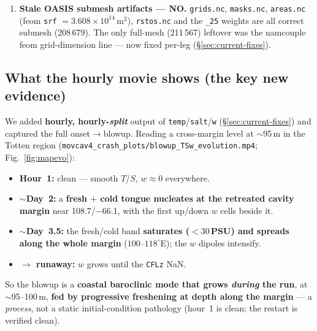 \documentclass[11pt,a4paper]{article}
\newcommand{\code}[1]{\texttt{\small #1}}
\newcommand{\file}[1]{\texttt{\footnotesize #1}}
\begin{document}
\begin{enumerate}[leftmargin=1.6em,itemsep=3pt]
        \textbf{legitimate under-ice cavity masking} (level-index~0 at cavity nodes with
        \code{ulevels}~$2$--$27$), \emph{not} a fresh cap; at each node's \emph{first wet
        level} $S$ is normal and matches the source, and \emph{none} of those nodes retreated.
        The $\sim$12\,PSU seen in the blowup-file profile is the \emph{evolved} state (the
        symptom), not the initial condition. \textbf{Do not re-chase this.}
  \item \textbf{Stale OASIS submesh artifacts --- NO.} \file{grids.nc}, \file{masks.nc},
        \file{areas.nc} (feom \code{srf} $=3.608\times10^{14}$\,m$^2$), \file{rstos.nc} and
        the \code{\_25} weights are all correct submesh (208\,679). The only full-mesh
        (211\,567) leftover was the namcouple feom grid-dimension line --- now fixed per-leg
        (\S\ref{sec:current-fixes}).
\end{enumerate}

\subsection{What the hourly movie shows (the key new evidence)}\label{sec:movie}
We added \textbf{hourly, hourly-\emph{split}} output of \code{temp}/\code{salt}/\code{w}
(\S\ref{sec:current-fixes}) and captured the full onset$\to$blowup. Reading a cross-margin
level at $\sim$95\,m in the Totten region (\file{movcav4\_crash\_plots/blowup\_TSw\_evolution.mp4};
Fig.~\ref{fig:mapevo}):
\begin{itemize}[leftmargin=1.4em,itemsep=1pt]
  \item \textbf{Hour~1:} clean --- smooth $T$/$S$, $w\approx0$ everywhere.
  \item \textbf{$\sim$Day~2:} a \textbf{fresh $+$ cold tongue nucleates at the retreated
        cavity margin} near 108.7/$-$66.1, with the first up/down $w$ cells beside it.
  \item \textbf{$\sim$Day~3.5:} the fresh/cold band \textbf{saturates ($<30$\,PSU) and spreads
        along the whole margin} ($100$--$118^\circ$E); the $w$ dipoles intensify.
  \item \textbf{$\to$ runaway:} $w$ grows until the \code{CFLz} NaN.
\end{itemize}
So the blowup is a \textbf{coastal baroclinic mode that grows \emph{during} the run}, at
$\sim$95--100\,m, \textbf{fed by progressive freshening at depth along the margin} --- a
\emph{process}, not a static initial-condition pathology (hour~1 is clean; the restart is
verified clean).
\end{document}
